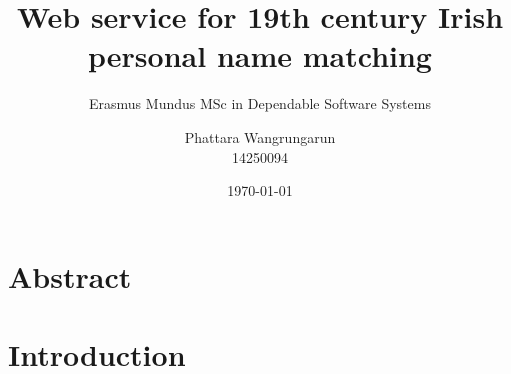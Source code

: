 \documentclass[a4paper, 11pt]{scrartcl}
\begin{document}
\title{Web service for 19th century Irish personal name matching}
\author{Phattara Wangrungarun\\14250094}
\subtitle{Erasmus Mundus MSc in Dependable Software Systems}
\date{\small\today}
\maketitle

\tableofcontents

\section*{Abstract}

\section{Introduction}
\end{document}
